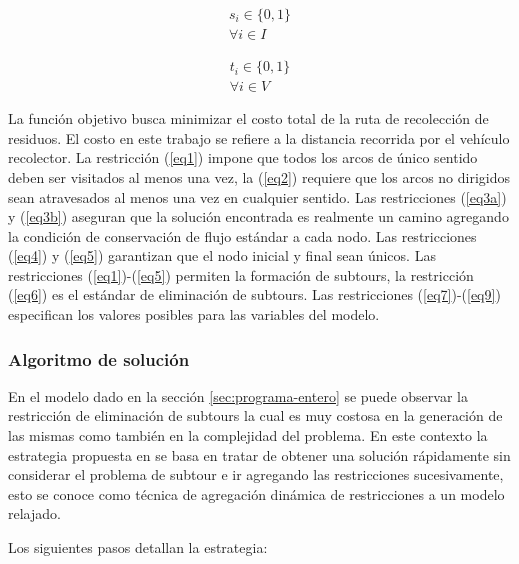 \documentclass[spanish, conference]{IEEEtran}
\begin{document}
\begin{equation} \tag{8} \label{eq8}
\begin{gathered}
    s_i \in \{0,1\} \\
    \forall i \in I
\end{gathered}
\end{equation}
\hbox{}

\begin{equation} \tag{9} \label{eq9}
\begin{gathered}
    t_i \in \{0,1\} \\
    \forall i \in V
\end{gathered}
\end{equation}

La función objetivo busca minimizar el costo total de la ruta de recolección de residuos. El costo en este trabajo se refiere a la distancia recorrida por el vehículo recolector. La restricción (\ref{eq1}) impone que todos los arcos de único sentido deben ser visitados al menos una vez, la (\ref{eq2}) requiere que los arcos no dirigidos sean atravesados al menos una vez en cualquier sentido. Las restricciones (\ref{eq3a}) y (\ref{eq3b}) aseguran que la solución encontrada es realmente un camino agregando la condición de conservación de flujo estándar a cada nodo. Las restricciones (\ref{eq4}) y (\ref{eq5}) garantizan que el nodo inicial y final sean únicos. Las restricciones (\ref{eq1})-(\ref{eq5}) permiten la formación de subtours, la restricción (\ref{eq6}) es el estándar de eliminación de subtours. Las restricciones (\ref{eq7})-(\ref{eq9}) especifican los valores posibles para las variables del modelo.

\subsubsection{Algoritmo de solución}
\label{algoritmo-solucion}
En el modelo dado en la sección \ref{sec:programa-entero} se puede observar la restricción de eliminación de subtours la cual es muy costosa en la generación de las mismas como también en  la complejidad del problema. En este contexto la estrategia propuesta en \cite{Braier2017AnArgentina} se basa en tratar de obtener una solución rápidamente sin considerar el problema de subtour e ir agregando las restricciones sucesivamente, esto se conoce como técnica de agregación dinámica de restricciones a un modelo relajado.

Los siguientes pasos detallan la estrategia:
\end{document}

